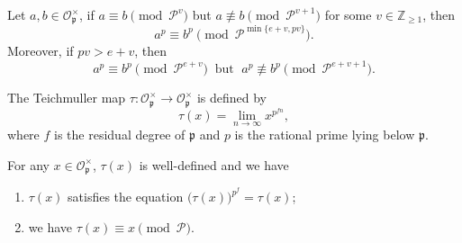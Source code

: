 \documentclass[10pt,a4paper]{amsart}
\newcommand{\Z}{\mathbb Z}
\begin{document}
	\begin{lem}\label{2601061529}
		Let $a,b\in\mathcal{O}_{\mathfrak{p}}^{\times}$, if 
		$a\equiv b\!\!\pmod{\mathcal{P}^v}$ but $a\not\equiv b\!\!\pmod{\mathcal{P}^{v+1}}$ for some $v\in\Z_{\ge1}$, then 
		\begin{equation}\label{25112141150}
			a^p\equiv b^p\!\!\pmod{\mathcal{P}^{\min\{e+v,pv\}}}. 
		\end{equation}
		Moreover, if $pv>e+v$, then
		\begin{equation}\label{2512141206}
			a^p\equiv b^p\!\!\pmod{\mathcal{P}^{e+v}}\;\;\text{but }\;a^p\not\equiv b^p\!\!\pmod{\mathcal{P}^{e+v+1}}.
		\end{equation}
	\end{lem}

	\begin{defn}
		The Teichmuller map $\tau\colon\mathcal{O}_{\mathfrak{p}}^{\times}\to\mathcal{O}_{\mathfrak{p}}^{\times}$ is defined by
		\begin{equation}\label{2505091040}
			\tau(x)=\lim_{n\to\infty}x^{p^{fn}},
		\end{equation}
		where  $f$ is the residual degree of $\mathfrak{p}$ and $p$ is the rational prime lying below $\mathfrak{p}$. 
	\end{defn}

	\begin{lem}\label{25050091445}     	
		For any $x \in \mathcal{O}_{\mathfrak{p}}^{\times}$, $\tau(x)$ is well-defined and we have 
		\begin{enumerate}[\upshape(i)]
			\item\label{2505091447}  $\tau(x)$ satisfies the equation $\big(\tau(x)\big)^{p^f}=\tau(x)$;
			\item\label{2505091446}  we have $\tau(x)\equiv x\pmod{\mathcal{P}}$. 
		\end{enumerate}
	\end{lem}
\end{document}

